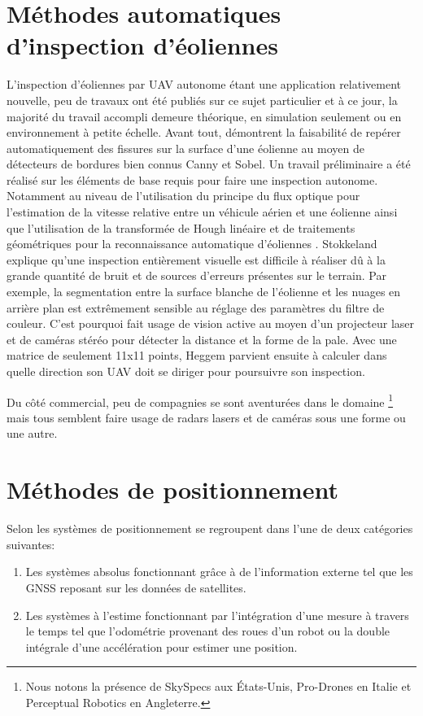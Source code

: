 \section{Méthodes automatiques d'inspection d'éoliennes}\label{subsec:eolienne}

L'inspection d'éoliennes par UAV autonome étant une application relativement nouvelle, peu de travaux ont été publiés sur ce sujet particulier et à ce jour, la majorité du travail accompli demeure théorique, en simulation seulement ou en environnement à petite échelle. Avant tout, \citep{Zhang2014} démontrent la faisabilité de repérer automatiquement des fissures sur la surface d'une éolienne au moyen de détecteurs de bordures bien connus Canny et Sobel. Un travail préliminaire a été réalisé sur les éléments de base requis pour faire une inspection autonome. Notamment au niveau de l'utilisation du principe du flux optique pour l'estimation de la vitesse relative entre un véhicule aérien et une éolienne \citep{Hoglund2014} ainsi que l'utilisation de la transformée de Hough linéaire et de traitements géométriques pour la reconnaissance automatique d'éoliennes \citep{Stokkeland2015}. Stokkeland explique qu'une inspection entièrement visuelle est difficile à réaliser dû à la grande quantité de bruit et de sources d'erreurs présentes sur le terrain. Par exemple, la segmentation entre la surface blanche de l'éolienne et les nuages en arrière plan est extrêmement sensible au réglage des paramètres du filtre de couleur. C'est pourquoi \citep{Heggem2017} fait usage de vision active au moyen d'un projecteur laser et de caméras stéréo pour détecter la distance et la forme de la pale. Avec une matrice de seulement 11x11 points, Heggem parvient ensuite à calculer dans quelle direction son UAV doit se diriger pour poursuivre son inspection.

Du côté commercial, peu de compagnies se sont aventurées dans le domaine \footnote{Nous notons la présence de SkySpecs aux États-Unis, Pro-Drones en Italie et Perceptual Robotics en Angleterre.} mais tous semblent faire usage de radars lasers et de caméras sous une forme ou une autre.

\section{Méthodes de positionnement}\label{subsec:positionnement}

Selon \citep{Borenstein1997} les systèmes de positionnement se regroupent dans l'une de deux catégories suivantes:
\begin{enumerate}
  \item Les systèmes absolus fonctionnant grâce à de l'information externe tel que les GNSS reposant sur les données de satellites.
  \item Les systèmes à l'estime fonctionnant par l'intégration d'une mesure à travers le temps tel que l'odométrie provenant des roues d'un robot ou la double intégrale d'une accélération pour estimer une position.
\end{enumerate}

